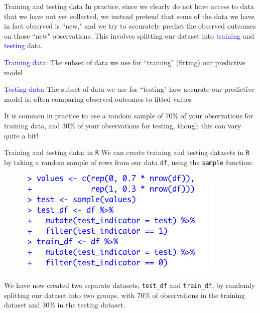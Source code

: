 \documentclass[10pt,t]{beamer}
\begin{document}
\begin{frame}{Training and testing data}
In practice, since we clearly do not have access to data that we have not yet collected, we instead pretend that some of the data we have in fact observed is ``new," and we try to accurately predict the observed outcomes on those ``new" observations. This involves splitting our dataset into \textcolor{blue}{training} and \textcolor{blue}{testing} data.

\vspace{0.3cm}

\textcolor{blue}{Training data:} The subset of data we use for ``training" (fitting) our predictive model

\vspace{0.3cm}

\textcolor{blue}{Testing data:} The subset of data we use for ``testing" how accurate our predictive model is, often comparing observed outcomes to fitted values

\vspace{0.3cm}

It is common in practice to use a random sample of 70\% of your observations for training data, and 30\% of your observations for testing, though this can vary quite a bit!

\end{frame}

\begin{frame}{Training and testing data: in \texttt{R}}
We can create training and testing datasets in \texttt{R} by taking a random sample of rows from our data \texttt{df}, using the \texttt{sample} function:

\vspace{0.1cm}

\begin{figure}
	\centering \includegraphics[scale=0.5]{traintest.png}
\end{figure}

\vspace{0.1cm}

We have now created two separate datasets, \texttt{test\_df} and \texttt{train\_df}, by randomly splitting our dataset into two groups, with 70\% of observations in the training dataset and 30\% in the testing dataset.

\end{frame}
\end{document}
